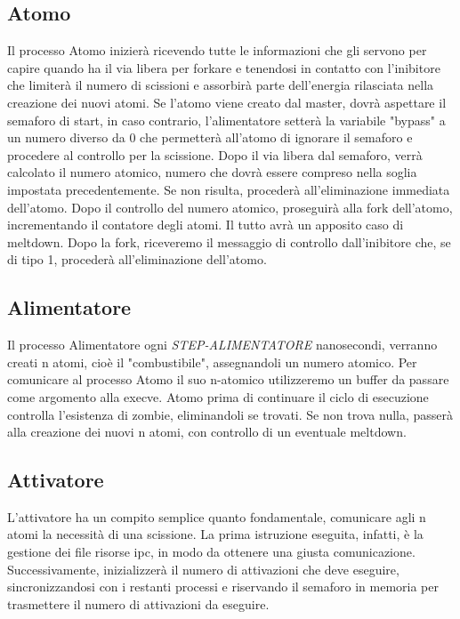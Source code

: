 \documentclass{article}
\begin{document}
\subsection{Atomo}
Il processo Atomo inizierà ricevendo tutte le informazioni che gli servono per capire quando ha il via libera per forkare e tenendosi in contatto con l'inibitore che limiterà il numero di scissioni e assorbirà parte dell'energia rilasciata nella creazione dei nuovi atomi.
Se l'atomo viene creato dal master, dovrà aspettare il semaforo di start, in caso contrario, l'alimentatore setterà la variabile "bypass" a un numero diverso da 0 che permetterà all'atomo di ignorare il semaforo e procedere al controllo per la scissione. Dopo il via libera dal semaforo, verrà calcolato il numero atomico, numero che dovrà essere compreso nella soglia impostata precedentemente. Se non risulta, procederà all'eliminazione immediata dell'atomo.
Dopo il controllo del numero atomico, proseguirà alla fork dell'atomo, incrementando il contatore degli atomi. Il tutto avrà un apposito caso di meltdown.
Dopo la fork, riceveremo il messaggio di controllo dall'inibitore che, se di tipo 1, procederà all'eliminazione dell'atomo.

\subsection{Alimentatore}
Il processo Alimentatore ogni \textit{STEP-ALIMENTATORE} nanosecondi, verranno creati n atomi, cioè il "combustibile", assegnandoli un numero atomico. Per comunicare al processo Atomo il suo n-atomico utilizzeremo un buffer da passare come argomento alla execve. Atomo prima di continuare il ciclo di esecuzione controlla l'esistenza di zombie, eliminandoli se trovati. Se non trova nulla, passerà alla creazione dei nuovi n atomi, con controllo di un eventuale meltdown.

\subsection{Attivatore}
L'attivatore ha un compito semplice quanto fondamentale, comunicare agli n atomi la necessità di una scissione.
La prima istruzione eseguita, infatti, è la gestione dei file risorse ipc, in modo da ottenere una giusta comunicazione. Successivamente, inizializzerà il numero di attivazioni che deve eseguire, sincronizzandosi con i restanti processi e riservando il semaforo in memoria per trasmettere il numero di attivazioni da eseguire.
\end{document}
